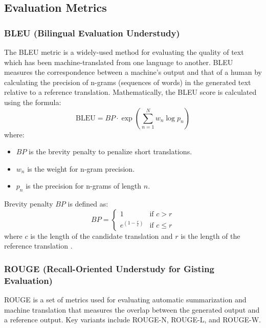 \subsection*{Evaluation Metrics}
\subsubsection*{BLEU (Bilingual Evaluation Understudy)}

The BLEU metric is a widely-used method for evaluating the quality of text which has been machine-translated from one language to another. BLEU measures the correspondence between a machine's output and that of a human by calculating the precision of n-grams (sequences of words) in the generated text relative to a reference translation. Mathematically, the BLEU score is calculated using the formula:
\[
\text{BLEU} = BP \cdot \exp \left( \sum_{n=1}^{N} w_n \log p_n \right)
\]
where:
\begin{itemize}
    \item \( BP \) is the brevity penalty to penalize short translations.
    \item \( w_n \) is the weight for n-gram precision.
    \item \( p_n \) is the precision for n-grams of length \( n \).
\end{itemize}

Brevity penalty \( BP \) is defined as:
\[
BP = 
\begin{cases} 
1 & \text{if } c > r \\
e^{(1-\frac{r}{c})} & \text{if } c \leq r 
\end{cases}
\]
where \( c \) is the length of the candidate translation and \( r \) is the length of the reference translation \cite{Reiter2018A}.

\subsubsection*{ROUGE (Recall-Oriented Understudy for Gisting Evaluation)}

ROUGE is a set of metrics used for evaluating automatic summarization and machine translation that measures the overlap between the generated output and a reference output. Key variants include ROUGE-N, ROUGE-L, and ROUGE-W.

